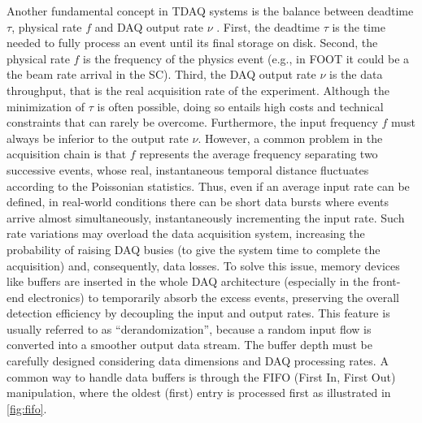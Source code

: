 Another fundamental concept in TDAQ systems is the balance between deadtime $\tau$, physical rate $f$ and DAQ output rate $\nu$ \cite{RidolfiPhDThesis}. First, the deadtime $\tau$ is the time needed to fully process an event until its final storage on disk. Second, the physical rate $f$ is the frequency of the physics event (e.g., in FOOT it could be a the beam rate arrival in the SC). Third, the DAQ output rate $\nu$ is the data throughput, that is the real acquisition rate of the experiment. Although the minimization of $\tau$ is often possible, doing so entails high costs and technical constraints that can rarely be overcome. Furthermore, the input frequency $f$ must always be inferior to the output rate $\nu$. However, a common problem in the acquisition chain is that $f$ represents the average frequency separating two successive events, whose real, instantaneous temporal distance fluctuates according to the Poissonian statistics. Thus, even if an average input rate can be defined, in real-world conditions there can be short data bursts where events arrive almost simultaneously, instantaneously incrementing the input rate. Such rate variations may overload the data acquisition system, increasing the probability of raising DAQ busies (to give the system time to complete the acquisition) and, consequently, data losses. To solve this issue, memory devices like buffers are inserted in the whole DAQ architecture (especially in the front-end electronics) to temporarily absorb the excess events, preserving the overall detection efficiency by decoupling the input and output rates. This feature is usually referred to as ``derandomization'', because a random input flow is converted into a smoother output data stream. The buffer depth must be carefully designed considering data dimensions and DAQ processing rates. A common way to handle data buffers is through the FIFO (First In, First Out) manipulation, where the oldest (first) entry is processed first as illustrated in \autoref{fig:fifo}.

